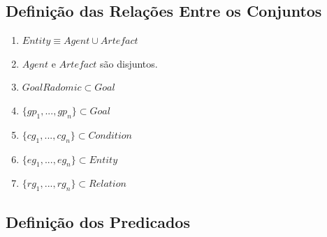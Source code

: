 \documentclass[12pt]{article}
\begin{document}
\subsection{Definição das Relações Entre os Conjuntos}

\begin{enumerate}
	\item $Entity \equiv Agent \cup Artefact$
	\item $Agent$ e $Artefact$ são disjuntos.
	\item $GoalRadomic \subset Goal$
	\item $\{gp_1,...,gp_n\} \subset Goal$
	\item $\{cg_1,...,cg_n\} \subset Condition$
	\item $\{eg_1,...,eg_n\} \subset Entity$		
	\item $\{rg_1,...,rg_n\} \subset Relation$	
\end{enumerate}

\subsection{Definição dos Predicados}
\end{document}
